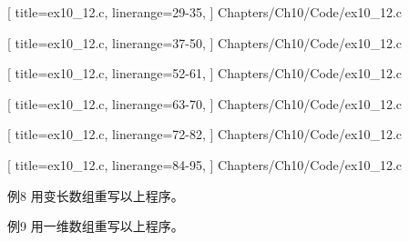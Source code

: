 \begin{frame}[fragile]\ft{\subsecname}

[
title=ex10\_12.c,
linerange={29-35},
]
{Chapters/Ch10/Code/ex10_12.c}
\end{frame}

\begin{frame}[fragile]\ft{\subsecname}

[
title=ex10\_12.c,
linerange={37-50},
]
{Chapters/Ch10/Code/ex10_12.c}
\end{frame}

\begin{frame}[fragile]\ft{\subsecname}

[
title=ex10\_12.c,
linerange={52-61},
]
{Chapters/Ch10/Code/ex10_12.c}
\end{frame}

\begin{frame}[fragile]\ft{\subsecname}

[
title=ex10\_12.c,
linerange={63-70},
]
{Chapters/Ch10/Code/ex10_12.c}
\end{frame}

\begin{frame}[fragile]\ft{\subsecname}

[
title=ex10\_12.c,
linerange={72-82},
]
{Chapters/Ch10/Code/ex10_12.c}
\end{frame}

\begin{frame}[fragile]\ft{\subsecname}

[
title=ex10\_12.c,
linerange={84-95},
]
{Chapters/Ch10/Code/ex10_12.c}
\end{frame}

\begin{frame}[fragile]\ft{\subsecname}
\begin{block}{例8}
用变长数组重写以上程序。
\end{block}
\end{frame}

\begin{frame}[fragile]\ft{\subsecname}
\begin{block}{例9}
用一维数组重写以上程序。
\end{block}
\end{frame}



